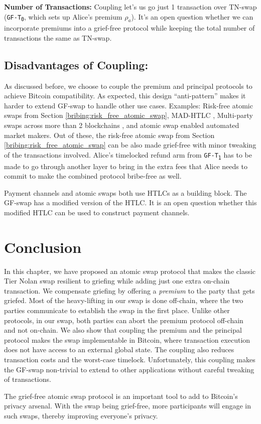 \bigbreak
\noindent
\textbf{Number of Transactions:} Coupling let's us go just 1 transaction over TN-swap (\texttt{GF-T\textsubscript{0}}, which sets up Alice's premium $\rho_a$). It's an open question whether we can incorporate premiums into a grief-free protocol while keeping the total number of transactions the same as TN-swap.

\subsection{Disadvantages of Coupling:} As discussed before, we choose to couple the premium and principal protocols to achieve Bitcoin compatibility. As expected, this design ``anti-pattern'' makes it harder to extend GF-swap to handle other use cases. Examples: Risk-free atomic swaps from Section \ref{bribing:risk_free_atomic_swap}, MAD-HTLC \cite{mad_htlc}, Multi-party swaps across more than 2 blockchains \cite{herlihy2018atomic}, and atomic swap enabled automated market makers. Out of these, the risk-free atomic swap from Section \ref{bribing:risk_free_atomic_swap} can be also made grief-free with minor tweaking of the transactions involved. Alice's timelocked refund arm from \texttt{GF-T\textsubscript{1}} has to be made to go through another layer to bring in the extra fees that Alice needs to commit to make the combined protocol bribe-free as well. 

Payment channels and atomic swaps both use HTLCs as a building block. The GF-swap has a modified version of the HTLC. It is an open question whether this modified HTLC can be used to construct payment channels.

\section{Conclusion}
In this chapter, we have proposed an atomic swap protocol that makes the classic Tier Nolan swap resilient to griefing while adding just one extra on-chain transaction. We compensate griefing by offering a \textit{premium} to the party that gets griefed. Most of the heavy-lifting in our swap is done off-chain, where the two parties communicate to establish the swap in the first place. Unlike other protocols, in our swap, both parties can abort the premium protocol off-chain and not on-chain. We also show that coupling the premium and the principal protocol makes the swap implementable in Bitcoin, where transaction execution does not have access to an external global state. The coupling also reduces transaction costs and the worst-case timelock. Unfortunately, this coupling makes the GF-swap non-trivial to extend to other applications without careful tweaking of transactions.

The grief-free atomic swap protocol is an important tool to add to Bitcoin's privacy arsenal. With the swap being grief-free, more participants will engage in such swaps, thereby improving everyone's privacy.
